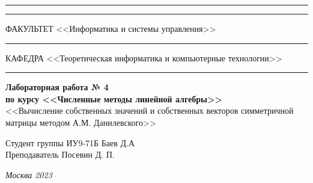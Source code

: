 \documentclass[a4paper, 14pt]{extarticle}
\begin{document}
\begin{titlepage}
\vspace{-25pt}
\hspace{-35pt}\rule{\textwidth}{2.3pt}

\vspace*{-20.3pt}
\hspace{-35pt}\rule{\textwidth}{0.4pt}

\vspace{1.5ex}
\hspace{-35pt} \noindent \small ФАКУЛЬТЕТ\hspace{80pt} <<Информатика и системы управления>>

\vspace*{-16pt}
\hspace{47pt}\rule{0.83\textwidth}{0.4pt}

\vspace{0.5ex}
\hspace{-35pt} \noindent \small КАФЕДРА\hspace{50pt} <<Теоретическая информатика и компьютерные технологии>>

\vspace*{-16pt}
\hspace{30pt}\rule{0.866\textwidth}{0.4pt}

\vspace{11em}

\begin{center}
\Large {\bf Лабораторная работа № 4} \\
\large {\bf по курсу <<Численные методы линейной алгебры>>} \\
\large <<Вычисление собственных значений и собственных
векторов симметричной матрицы методом А.М.
Данилевского>>
\end{center}\normalsize

\vspace{8em}


\begin{flushright}
  {Студент группы ИУ9-71Б Баев Д.А \hspace*{15pt}\\
  \vspace{2ex}
  Преподаватель Посевин Д. П.\hspace*{15pt}}
\end{flushright}

\bigskip

\vfill


\begin{center}
\textsl{Москва 2023}
\end{center}
\end{titlepage}
\end{document}
